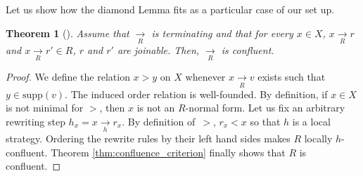 \documentclass[10pt]{easychair}
\newtheorem{theorem}{Theorem}[section]
\theoremstyle{definition}
\newcommand\supp{\text{supp}}
\newcommand\rewR{\underset{R}{\longrightarrow}}
\newcommand\rewh{\underset{h}{\longrightarrow}}
\begin{document}
Let us show how the diamond Lemma fits as a particular case of our set up.
\smallskip

\begin{theorem}[\cite{MR506890}]
  Assume that $\rewR$ is terminating and that for every $x\in X$, $x\rewR r$ and $x\rewR r'\in R$, $r$ and $r'$ are joinable. Then, $\rewR$ is confluent.
\end{theorem}

\begin{proof}
  We define the relation $x > y$ on $X$ whenever $x \rewR v$ exists such that $y\in\supp(v)$. The induced order relation is well-founded. By definition, if $x \in X$ is not minimal for $>$, then $x$ is not an $R$-normal form. Let us fix an arbitrary rewriting step $h_x= x \rewh r_x$.  By definition of~$>$, $r_x < x$ so that $h$ is a local strategy. Ordering the rewrite rules by their left hand sides makes $R$ locally $h$-confluent. Theorem \ref{thm:confluence_criterion} finally shows that $R$ is confluent.  
\end{proof}


\end{document}
